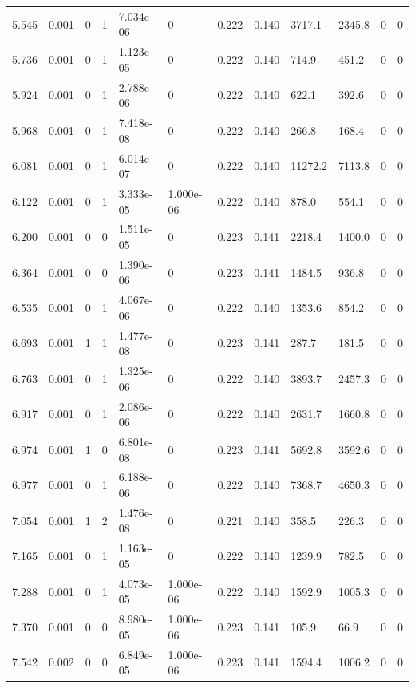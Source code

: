 \documentclass[preview]{standalone}
\begin{document}
{{{\begin{tabular}{L{1.2cm}C{1.2cm} C{0.3cm}C{0.5cm} C{1.4cm}C{1.4cm} C{1.4cm}C{1.4cm} C{1.6cm}C{1.6cm} C{1.6cm}C{1.6cm}}
  5.545  &  0.001  & 0     &  1 &  7.034e-06  & 0  &  0.222&   0.140& 3717.1 & 2345.8   &  0 & 0  \\ 
  5.736  &  0.001  & 0     &  1 &  1.123e-05  & 0  &  0.222&   0.140& 714.9 & 451.2   &  0 & 0  \\ 
  5.924  &  0.001  & 0     &  1 &  2.788e-06  & 0  &  0.222&   0.140& 622.1 & 392.6   &  0 & 0  \\ 
  5.968  &  0.001  & 0     &  1 &  7.418e-08  & 0  &  0.222&   0.140& 266.8 & 168.4   &  0 & 0  \\ 
  6.081  &  0.001  & 0     &  1 &  6.014e-07  & 0  &  0.222&   0.140& 11272.2 & 7113.8   &  0 & 0  \\ 
  6.122  &  0.001  & 0     &  1 &  3.333e-05  & 1.000e-06  &  0.222&   0.140& 878.0 & 554.1   &  0 & 0  \\ 
  6.200  &  0.001  & 0     &  0 &  1.511e-05  & 0  &  0.223&   0.141& 2218.4 & 1400.0   &  0 & 0  \\ 
  6.364  &  0.001  & 0     &  0 &  1.390e-06  & 0  &  0.223&   0.141& 1484.5 & 936.8   &  0 & 0  \\ 
  6.535  &  0.001  & 0     &  1 &  4.067e-06  & 0  &  0.222&   0.140& 1353.6 & 854.2   &  0 & 0  \\ 
  6.693  &  0.001  & 1     &  1 &  1.477e-08  & 0  &  0.223&   0.141& 287.7 & 181.5   &  0 & 0  \\ 
  6.763  &  0.001  & 0     &  1 &  1.325e-06  & 0  &  0.222&   0.140& 3893.7 & 2457.3   &  0 & 0  \\ 
  6.917  &  0.001  & 0     &  1 &  2.086e-06  & 0  &  0.222&   0.140& 2631.7 & 1660.8   &  0 & 0  \\ 
  6.974  &  0.001  & 1     &  0 &  6.801e-08  & 0  &  0.223&   0.141& 5692.8 & 3592.6   &  0 & 0  \\ 
  6.977  &  0.001  & 0     &  1 &  6.188e-06  & 0  &  0.222&   0.140& 7368.7 & 4650.3   &  0 & 0  \\ 
  7.054  &  0.001  & 1     &  2 &  1.476e-08  & 0  &  0.221&   0.140& 358.5 & 226.3   &  0 & 0  \\ 
  7.165  &  0.001  & 0     &  1 &  1.163e-05  & 0  &  0.222&   0.140& 1239.9 & 782.5   &  0 & 0  \\ 
  7.288  &  0.001  & 0     &  1 &  4.073e-05  & 1.000e-06  &  0.222&   0.140& 1592.9 & 1005.3   &  0 & 0  \\ 
  7.370  &  0.001  & 0     &  0 &  8.980e-05  & 1.000e-06  &  0.223&   0.141& 105.9 & 66.9   &  0 & 0  \\ 
  7.542  &  0.002  & 0     &  0 &  6.849e-05  & 1.000e-06  &  0.223&   0.141& 1594.4 & 1006.2   &  0 & 0  \\ 

\end{tabular}}}}
\end{document}
